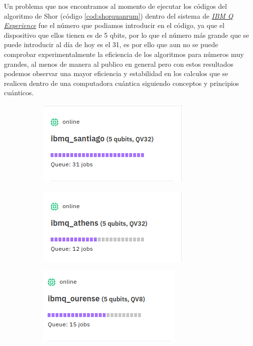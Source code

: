 Un problema que nos encontramos al momento de ejecutar los códigos del algoritmo de Shor (código \ref{cod:shorquanrum}) dentro del sistema de \href{https://quantum-computing.ibm.com/}{\textit{IBM Q Experience}} fue el número que podiamos introducir en el código, ya que
el dispositivo que ellos tienen es de 5 qbits, por lo que el número más grande que se puede introducir al día de hoy es el 31, es por ello que aun no se puede comprobar experimentalmente
la eficiencia de los algoritmos para números muy grandes, al menos de manera al publico en general pero con estos resultados podemos observar una mayor eficiencia y estabilidad en los calculos que se 
realicen dentro de una computadora cuántica siguiendo conceptos y principios cuánticos.
\begin{figure}[H]
    \begin{subfigure}{0.19\linewidth}
        \centering
        \includegraphics[scale=0.35]{images/santiago.png}
    \end{subfigure}
    \begin{subfigure}{0.19\linewidth}
        \centering
        \includegraphics[scale=0.35]{images/athrens.png}
    \end{subfigure}
    \begin{subfigure}{0.19\linewidth}
        \centering
        \includegraphics[scale=0.35]{images/ourense.png}

\end{subfigure}
\end{figure}
